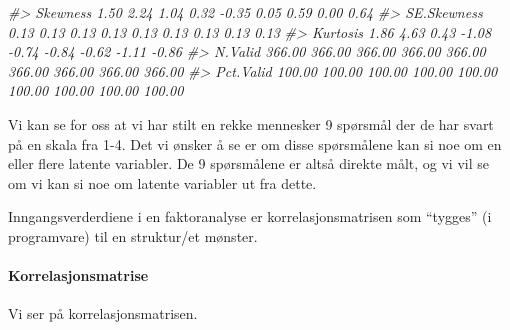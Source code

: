 \documentclass[
]{article}
\newenvironment{Shaded}{\begin{snugshade}}{\end{snugshade}}
\newcommand{\CommentTok}[1]{\textcolor[rgb]{0.56,0.35,0.01}{\textit{#1}}}
\begin{document}
\begin{Shaded}
\begin{Highlighting}[]
\CommentTok{\#\textgreater{}          Skewness     1.50     2.24     1.04     0.32    {-}0.35     0.05     0.59     0.00     0.64}
\CommentTok{\#\textgreater{}       SE.Skewness     0.13     0.13     0.13     0.13     0.13     0.13     0.13     0.13     0.13}
\CommentTok{\#\textgreater{}          Kurtosis     1.86     4.63     0.43    {-}1.08    {-}0.74    {-}0.84    {-}0.62    {-}1.11    {-}0.86}
\CommentTok{\#\textgreater{}           N.Valid   366.00   366.00   366.00   366.00   366.00   366.00   366.00   366.00   366.00}
\CommentTok{\#\textgreater{}         Pct.Valid   100.00   100.00   100.00   100.00   100.00   100.00   100.00   100.00   100.00}
\end{Highlighting}
\end{Shaded}

Vi kan se for oss at vi har stilt en rekke mennesker 9 spørsmål der de har svart på en skala fra 1-4. Det vi ønsker å se er om disse spørsmålene kan si noe om en eller flere latente variabler. De 9 spørsmålene er altså direkte målt, og vi vil se om vi kan si noe om latente variabler ut fra dette.

Inngangsverderdiene i en faktoranalyse er korrelasjonsmatrisen som ``tygges'' (i programvare) til en struktur/et mønster.

\hypertarget{korrelasjonsmatrise}{%
\paragraph{Korrelasjonsmatrise}\label{korrelasjonsmatrise}}

Vi ser på korrelasjonsmatrisen.
\end{document}
